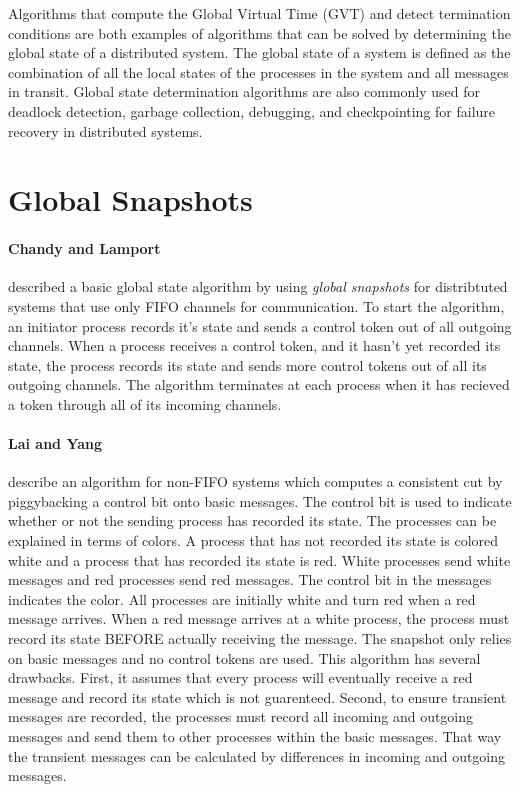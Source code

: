 \documentclass[11pt]{book}
\begin{document}
Algorithms that compute the Global Virtual Time (GVT) and detect termination conditions are
both examples of algorithms that can be solved by determining the global state of a
distributed system. The global state of a system is defined as the combination of all
the local states of the processes in the system and all messages in transit. Global state
determination algorithms are also commonly used for deadlock detection, garbage collection,
debugging, and checkpointing for failure recovery in distributed systems.

\section{Global Snapshots}

\paragraph{Chandy and Lamport}\cite{chandy-85} described a basic global state algorithm by
using \emph{global snapshots} for distribtuted systems that use only FIFO channels for
communication. To start the algorithm, an initiator process records it's state and sends
a control token out of all outgoing channels. When a process receives a control token, and
it hasn't yet recorded its state, the process records its state and sends more control
tokens out of all its outgoing channels. The algorithm terminates at each process when it
has recieved a token through all of its incoming channels.

\paragraph{Lai and Yang}\cite{lai-87} describe an algorithm for non-FIFO systems which
computes a consistent cut by piggybacking a control bit onto basic messages. The control
bit is used to indicate whether or not the sending process has recorded its state. The
processes can be explained in terms of colors. A process that has not recorded its state
is colored white and a process that has recorded its state is red. White processes send
white messages and red processes send red messages. The control bit in the messages indicates
the color. All processes are initially white and turn red when a red message arrives. When
a red message arrives at a white process, the process must record its state BEFORE actually
receiving the message. The snapshot only relies on basic messages and no control tokens are
used. This algorithm has several drawbacks. First, it assumes that every process will
eventually receive a red message and record its state which is not guarenteed. Second, to
ensure transient messages are recorded, the processes must record all incoming and outgoing
messages and send them to other processes within the basic messages. That way the transient
messages can be calculated by differences in incoming and outgoing messages.
\end{document}
